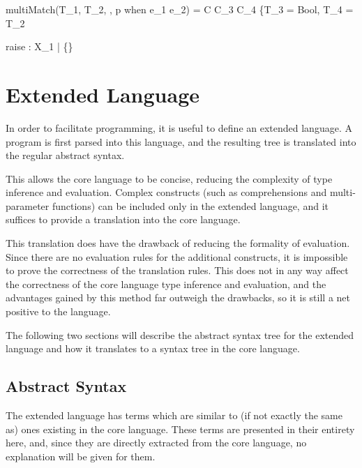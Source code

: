 \documentclass{article}
\begin{document}
  {multiMatch(T_1, T_2, \Gamma, p \; \mbox{when} \; e_1 \rightarrow e_2) = C \cup C_3 \cup C_4 \cup \{T_3 = Bool, T_4 = T_2}


\bigskip

    {\Gamma \vdash raise : X_1 \; | \; \{\}}

\newpage

\section{Extended Language}

In order to facilitate programming, it is useful to define an extended language.
A program is first parsed into this language, and the resulting tree is translated into the regular abstract syntax.

This allows the core language to be concise, reducing the complexity of type inference and evaluation.
Complex constructs (such as comprehensions and multi-parameter functions) can be included only in the extended language, and it suffices to provide a translation into the core language.

This translation does have the drawback of reducing the formality of evaluation.
Since there are no evaluation rules for the additional constructs, it is impossible to prove the correctness of the translation rules.
This does not in any way affect the correctness of the core language type inference and evaluation, and the advantages gained by this method far outweigh the drawbacks, so it is still a net positive to the language.

\medskip

The following two sections will describe the abstract syntax tree for the extended language and how it translates to a syntax tree in the core language.

\subsection{Abstract Syntax}

The extended language has terms which are similar to (if not exactly the same as) ones existing in the core language.
These terms are presented in their entirety here, and, since they are directly extracted from the core language, no explanation will be given for them.
\end{document}
